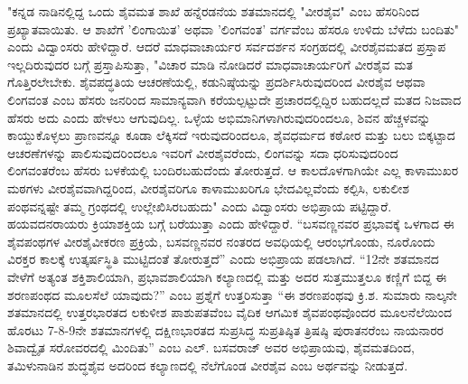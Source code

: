  "ಕನ್ನಡ ನಾಡಿನಲ್ಲಿದ್ದ ಒಂದು ಶೈವಮತ ಶಾಖೆ ಹನ್ನೆರಡನೆಯ ಶತಮಾನದಲ್ಲಿ "ವೀರಶೈವ" ಎಂಬ ಹೆಸರಿನಿಂದ ಪ್ರಖ್ಯಾತವಾಯಿತು. ಆ ಶಾಖೆಗೆ ’ಲಿಂಗಾಯಿತ’ ಅಥವಾ ’ಲಿಂಗವಂತ’ ವರ್ಗವೆಂಬ ಹೆಸರೂ ಉಳಿದು ಬೆಳೆದು ಬಂದಿತು" ಎಂದು ವಿದ್ವಾಂಸರು ಹೇಳಿದ್ದಾರೆ. ಆದರೆ ಮಾಧವಾಚಾರ್ಯರ ಸರ್ವದರ್ಶನ ಸಂಗ್ರಹದಲ್ಲಿ ವೀರಶೈವಮತದ ಪ್ರಸ್ತಾಪ ಇಲ್ಲದಿರುವುದರ ಬಗ್ಗೆ ಪ್ರಸ್ತಾಪಿಸುತ್ತಾ, "ವಿಚಾರ ಮಾಡಿ ನೋಡಿದರೆ ಮಾಧವಾಚಾರ್ಯರಿಗೆ ವೀರಶೈವ ಮತ ಗೊತ್ತಿರಲೇಬೇಕು. ಶೈವಪದ್ಧತಿಯ ಆಚರಣೆಯಲ್ಲಿ, ಕಡುನಿಷ್ಠೆಯನ್ನು ಪ್ರದರ್ಶಿಸಿರುವುದರಿಂದ ವೀರಶೈವ ಆಥವಾ ಲಿಂಗವಂತ ಎಂಬ ಹೆಸರು ಜನರಿಂದ ಸಾಮಾನ್ಯವಾಗಿ ಕರೆಯಲ್ಪಟ್ಟುದೇ ಪ್ರಚಾರದಲ್ಲಿದ್ದಿರ ಬಹುದಲ್ಲದೆ ಮತದ ನಿಜವಾದ ಹೆಸರು ಅದು ಎಂದು ಹೇಳಲು ಆಗುವುದಿಲ್ಲ. ಒಳ್ಳೆಯ ಅಭಿಮಾನಿಗಳಾಗಿರುವುದರಿಂದಲೂ, ಶಿವನ ಹೆಚ್ಚಳವನ್ನು ಕಾಯ್ದುಕೊಳ್ಳಲು ಪ್ರಾಣವನ್ನೂ ಕೂಡಾ ಲೆಕ್ಕಿಸದೆ ಇರುವುದರಿಂದಲೂ, ಶೈವಧರ್ಮದ ಕಠೋರ ಮತ್ತು ಬಲು ಬಿಕ್ಕಟ್ಟಾದ ಆಚರಣೆಗಳನ್ನು ಪಾಲಿಸುವುದರಿಂದಲೂ ಇವರಿಗೆ ವೀರಶೈವರೆಂದು, ಲಿಂಗವನ್ನು ಸದಾ ಧರಿಸುವುದರಿಂದ ಲಿಂಗವಂತರೆಂಬ ಹೆಸರು ಬಳಕೆಯಲ್ಲಿ ಬಂದಿರಬಹುದೆಂದು ತೋರುತ್ತದೆ. ಆ ಕಾಲದೊಳಗಾಗಿಯೇ ಎಲ್ಲ ಕಾಳಾಮುಖರ ಮಠಗಳು ವೀರಶೈವವಾಗಿದ್ದರಿಂದ, ವೀರಶೈವರಿಗೂ ಕಾಳಾಮುಖರಿಗೂ ಭೇದವಿಲ್ಲವೆಂದು ಕಲ್ಪಿಸಿ, ಲಕುಲೀಶ ಪಂಥವನ್ನಷ್ಟೇ ತಮ್ಮ ಗ್ರಂಥದಲ್ಲಿ ಉಲ್ಲೇಖಿಸಿರಬಹುದು" ಎಂದು ವಿದ್ವಾಂಸರು ಅಭಿಪ್ರಾಯ ಪಟ್ಟಿದ್ದಾರೆ. ಹಯವದನರಾಯರು ಕ್ರಿಯಾಶಕ್ತಿಯ ಬಗ್ಗೆ ಬರೆಯುತ್ತಾ  ಎಂದು ಹೇಳಿದ್ದಾರೆ. “ಬಸವಣ್ಣನವರ ಪ್ರಭಾವಕ್ಕೆ ಒಳಗಾದ ಈ ಶೈವಪಂಥಗಳ ವೀರಶೈವೀಕರಣ ಪ್ರಕ್ರಿಯೆ, ಬಸವಣ್ಣನವರ ನಂತರದ ಅವಧಿಯಲ್ಲಿ ಆರಂಭಗೊಂಡು, ನೂರೊಂದು ವಿರಕ್ತರ ಕಾಲಕ್ಕೆ ಉತ್ಕರ್ಷಸ್ಥಿತಿ ಮುಟ್ಟಿದಂತೆ ತೋರುತ್ತದೆ” ಎಂದು ಅಭಿಪ್ರಾಯ ಪಡಲಾಗಿದೆ. “12ನೇ ಶತಮಾನದ ವೇಳೆಗೆ ಅತ್ಯಂತ ಶಕ್ತಿಶಾಲಿಯಾಗಿ, ಪ್ರಭಾವಶಾಲಿಯಾಗಿ ಕಲ್ಯಾಣದಲ್ಲಿ ಮತ್ತು ಅದರ ಸುತ್ತಮುತ್ತಲೂ ಕಣ್ಣಿಗೆ ಬಿದ್ದ ಈ ಶರಣಪಂಥದ ಮೂಲಸೆಲೆ ಯಾವುದು?” ಎಂಬ ಪ್ರಶ್ನೆಗೆ ಉತ್ತರಿಸುತ್ತಾ “ಈ ಶರಣಪಂಥವು ಕ್ರಿ.ಶ. ಸುಮಾರು ನಾಲ್ಕನೇ ಶತಮಾನದಲ್ಲಿ ಉತ್ತರಭಾರತದ ಲಕುಳೀಶ ಪಾಶುಪತವೆಂಬ ವೈದಿಕ ಆಗಮಿಕ ಶೈವಪಂಥವೊಂದರ ಮೂಲನೆಲೆಯಿಂದ ಹೊರಟು 7-8-9ನೇ ಶತಮಾನಗಳಲ್ಲಿ ದಕ್ಷಿಣಭಾರತದ ಸುಪ್ರಸಿದ್ಧ ಸುಪ್ರತಿಷ್ಠಿತ ತ್ರಿಷಷ್ಠಿ ಪುರಾತನರೆಂಬ ನಾಯನಾರರ ಶಿವಾದ್ವೈತ ಸರೋವರದಲ್ಲಿ ಮಿಂದಿತು” ಎಂಬ ಎಲ್​. ಬಸವರಾಜ್​ ಅವರ ಅಭಿಪ್ರಾಯವು, ಶೈವಮತದಿಂದ, ತಮಿಳುನಾಡಿನ ಶುದ್ಧಶೈವ ಅದರಿಂದ ಕಲ್ಯಾಣದಲ್ಲಿ ನೆಲೆಗೊಂಡ ವೀರಶೈವ ಎಂಬ ಅರ್ಥವನ್ನು ನೀಡುತ್ತದೆ.

